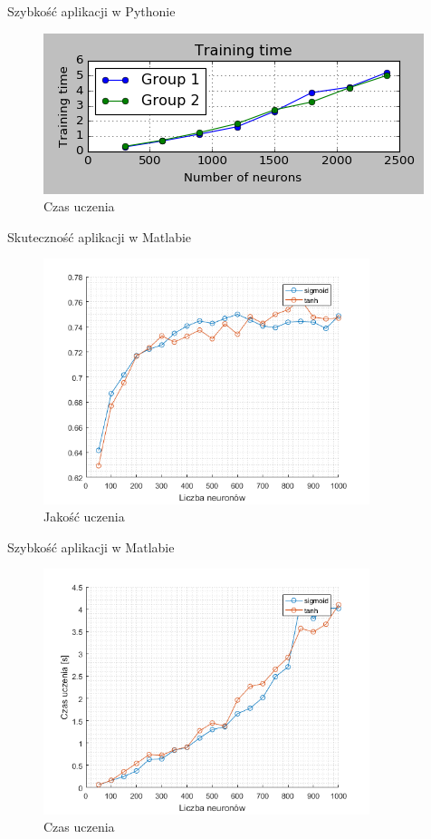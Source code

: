 \documentclass{beamer}
\begin{document}
\begin{frame}{Szybkość aplikacji w Pythonie}
\begin{figure}[H]
\includegraphics[width=\textwidth]{wyniki_forest_python_training_time.png}
\caption{Czas uczenia}
\end{figure}
\end{frame}

\begin{frame}{Skuteczność aplikacji w Matlabie}
\begin{figure}[H]
\centering
\includegraphics[width=0.85\textwidth]{forest_liczba_neuronow.png}
\caption{Jakość uczenia}
\end{figure}
\end{frame}

\begin{frame}{Szybkość aplikacji w Matlabie}
\begin{figure}[H]
\centering
\includegraphics[width=0.85\textwidth]{forest_wydajnosc.png}
\caption{Czas uczenia}
\end{figure}
\end{frame}
\end{document}
